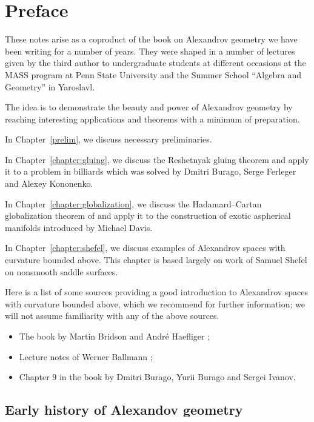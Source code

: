 \mainmatter

\chapter*{Preface}

These notes arise as a coproduct of the book on Alexandrov geometry
we have been writing for  a number of years.
They were shaped in a number of lectures given by the third author
to undergraduate students 
at different  occasions at the
MASS program at Penn State University
and the Summer School ``Algebra and Geometry'' in Yaroslavl.

The idea is to demonstrate the beauty and power of Alexandrov geometry by reaching interesting applications and theorems with a minimum of preparation.

\medskip 

In Chapter~\ref{prelim}, we discuss necessary preliminaries.

In Chapter~\ref{chapter:gluing}, we discuss the Reshetnyak gluing theorem and apply it to a problem in billiards which was solved by Dmitri Burago, Serge Ferleger and Alexey Kononenko.

In Chapter~\ref{chapter:globalization}, we discuss the Hadamard--Cartan globalization theorem of  and apply it to the construction of exotic aspherical manifolds introduced by Michael Davis.

In Chapter~\ref{chapter:shefel}, we discuss examples of Alexandrov spaces with curvature bounded above.
This chapter is based largely on work of Samuel Shefel on nonsmooth saddle surfaces.

\medskip

Here is a list of some sources providing a good introduction to Alexandrov spaces with curvature bounded above, which we recommend for further information;
we will not assume familiarity with any of the above sources.

\begin{itemize}
\item The book by Martin Bridson and Andr\'e Haefliger \cite{BH};
\item Lecture notes of Werner Ballmann \cite{ballmann:lectures};
\item Chapter 9 in the book \cite{BBI} by Dmitri Burago, Yurii Burago and Sergei Ivanov.
\end{itemize}



\section*{Early history of Alexandov geometry}

